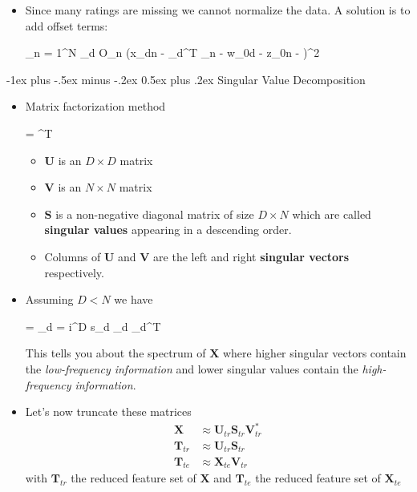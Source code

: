 \documentclass[10pt,a4paper,landscape]{article}
\makeatletter
\renewcommand{\section}{\@startsection{section}{1}{0mm}%
                                {-1ex plus -.5ex minus -.2ex}%
                                {0.5ex plus .2ex}%
                                {\normalfont\large\bfseries}}
\def\*#1{\mathbf{#1}}
\newenvironment{myalign*}{%
  \setlength{\abovedisplayskip}{8pt}%
  \setlength{\belowdisplayskip}{8pt}%
  \start@align\@ne\st@rredtrue\m@ne
}%
{\endalign}
\makeatother
\begin{document}
\begin{multicols*}{2}
\begin{itemize}
	 \item Since many ratings are missing we cannot normalize the data. A solution is to add offset terms:
	 \begin{myalign*}
	      \sum_{n = 1}^N \sum_{d \in O_n} (x_{dn} - \*w_d^T \*z_n - w_{0d} - z_{0n} - \mu)^2
	 \end{myalign*}
\end{itemize}

\section{Singular Value Decomposition}
\begin{itemize}
	\item Matrix factorization method
	\begin{myalign*}
	    \*X = \*U \*S \*V^T
	\end{myalign*}
	\begin{itemize}
		\item $\*U$ is an $D \times D$ matrix
		\item $\*V$ is an $N \times N$ matrix
		\item $\*S$ is a non-negative diagonal matrix of size $D \times N$ which are called \textbf{singular values} appearing in a descending order.
		\item Columns of $\*U$ and $\*V$ are the left and right \textbf{singular vectors} respectively.
	\end{itemize}
	\item Assuming $D < N$ we have
	\begin{myalign*}
	    \*X = \sum_{d = i}^D s_d \*u_d \*v_d^T
	\end{myalign*}
	This tells you about the spectrum of $\*X$ where higher singular vectors contain the \textit{low-frequency information} and lower singular values contain the \textit{high-frequency information}.
    \item Let's now truncate these matrices
    \begin{align*}
        \*X &\approx \*U_{tr} \*S_{tr} \*V^*_{tr} \\
        \*T_{tr} &\approx \*U_{tr} \*S_{tr} \\
        \*T_{te} &\approx \*X_{te}\*V_{tr}
    \end{align*}
    with $\*T_{tr}$ the reduced feature set of $\*X$ and $\*T_{te}$ the reduced feature set of $\*X_{te}$
\end{itemize}


\end{multicols*}
\end{document}
